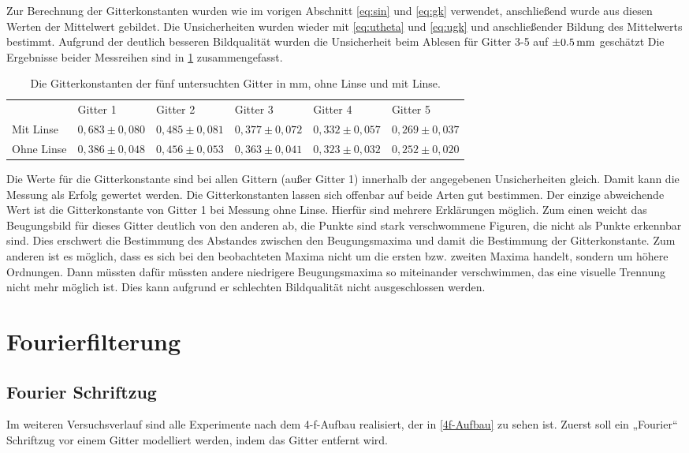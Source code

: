 Zur Berechnung der Gitterkonstanten wurden wie im vorigen Abschnitt \cref{eq:sin} und \cref{eq:gk} verwendet, anschließend wurde aus diesen Werten der Mittelwert gebildet. Die Unsicherheiten wurden wieder mit \cref{eq:utheta} und \cref{eq:ugk} und anschließender Bildung des Mittelwerts bestimmt. Aufgrund der deutlich besseren Bildqualität wurden die Unsicherheit beim Ablesen für Gitter 3-5 auf $\SI{\pm0,5}{mm}$ geschätzt Die Ergebnisse beider Messreihen sind in \cref{tab2} zusammengefasst.

\begin{table}[h]
	\caption{Die Gitterkonstanten der fünf untersuchten Gitter in mm, ohne Linse und mit Linse.}
	\begin{tabular}{llllll}
		&Gitter 1 & Gitter 2& Gitter 3& Gitter 4& Gitter 5\\
		Mit Linse&$0,683\pm0,080$ & $0,485\pm0,081$ & $0,377\pm0,072$ & $0,332\pm0,057$ & $0,269\pm0,037$\\
		Ohne Linse&$0,386\pm0,048$ & $0,456\pm0,053$ & $0,363\pm0,041$ & $0,323\pm0,032$ & $0,252\pm0,020$
	\end{tabular}
	\label{tab2}
\end{table}

Die Werte für die Gitterkonstante sind bei allen Gittern (außer Gitter 1) innerhalb der angegebenen Unsicherheiten gleich. Damit kann die Messung als Erfolg gewertet werden. Die Gitterkonstanten lassen sich offenbar auf beide Arten gut bestimmen. Der einzige abweichende Wert ist die Gitterkonstante von Gitter 1 bei Messung ohne Linse. Hierfür sind mehrere Erklärungen möglich. Zum einen weicht das Beugungsbild für dieses Gitter deutlich von den anderen ab, die Punkte sind stark verschwommene Figuren, die nicht als Punkte erkennbar sind. Dies erschwert die Bestimmung des Abstandes zwischen den Beugungsmaxima und damit die Bestimmung der Gitterkonstante. Zum anderen ist es möglich, dass es sich bei den beobachteten Maxima nicht um die ersten bzw. zweiten Maxima handelt, sondern um höhere Ordnungen. Dann müssten dafür müssten andere niedrigere Beugungsmaxima so miteinander verschwimmen, das eine visuelle Trennung nicht mehr möglich ist. Dies kann aufgrund er schlechten Bildqualität nicht ausgeschlossen werden.

\section{Fourierfilterung}
\subsection{Fourier Schriftzug}
Im weiteren Versuchsverlauf sind alle Experimente nach dem 4-f-Aufbau realisiert, der in \cref{4f-Aufbau} zu sehen ist. Zuerst soll ein „Fourier“ Schriftzug vor einem Gitter modelliert werden, indem das Gitter entfernt wird.

